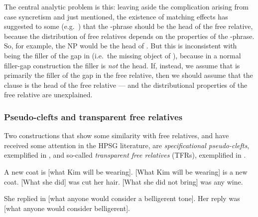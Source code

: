 \documentclass[output=paper
 	        ,biblatex
                ,babelshorthands
                ,newtxmath
                ,draftmode
                ,colorlinks, citecolor=brown
]{langscibook}
\begin{document}
The central analytic problem is this: leaving aside the complication arising from case
syncretism and  just mentioned, the existence of matching effects has
suggested to some (e.g.\ \citealt{Kubota:03}) that the -phrase should be the head
of the free relative, because the distribution of free relatives depends on the properties
of the -phrase. So, for
example, the NP  would be the head of . But this is
inconsistent with  being the filler of the gap in 
(i.e.\ the missing object of ), because in a normal filler-gap construction
the filler is \emph{not} the head. If, instead, we assume that  is primarily the
filler of the gap in the free relative, then we should assume that the clause  is the head of the free relative --- and the distributional properties
of the free relative are unexplained.

\subsubsection{Pseudo-clefts and transparent free relatives}
\label{sec:rc-pseudo-clefts-transp}

Two constructions that show some similarity with free relatives, and have received
some attention in the HPSG literature, are \emph{specificational pseudo-clefts}, exemplified in , and so-called
\emph{transparent free relatives} (TFRs), exemplified in .
\begin{exe}\ex\begin{xlist}\label{x:rc-158}
  \ex\label{x:rc-159} A new coat is [what Kim will be wearing].
  \ex\label{x:rc-160} {}[What Kim will be wearing] is a new coat.
  \ex\label{x:rc-161} {}[What she did] was cut her hair. 
  \ex\label{x:rc-162} {}[What she did not bring] was any wine.
\end{xlist}\end{exe}
\begin{exe}\ex\begin{xlist}\label{x:rc-163}
 \ex\label{x:rc-164} She replied in [what anyone would consider \trace a belligerent tone].
 \ex\label{x:rc-165} Her reply was [what anyone would consider \trace belligerent].  
\end{xlist}\end{exe}
\end{document}
